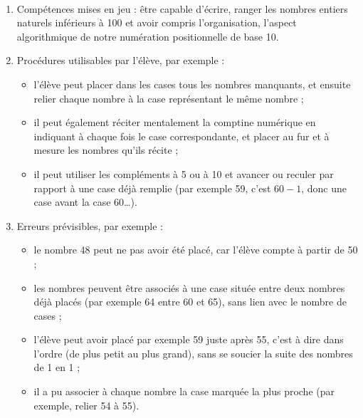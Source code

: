 \begin{corrige}
\ \\ [-5mm]
\begin{enumerate}
   \item Compétences mises en jeu : être capable d'écrire, ranger les nombres entiers naturels inférieurs à 100 et avoir compris l'organisation, l'aspect algorithmique de notre numération positionnelle de base 10.
   \item Procédures utilisables par l'élève, par exemple :
   \begin{itemize}
      \item l'élève peut placer dans les cases tous les nombres manquants, et ensuite relier chaque nombre à la case représentant le même nombre ;
      \item il peut également réciter \og mentalement \fg{} la comptine numérique en indiquant à chaque fois le case correspondante, et placer au fur et à mesure les nombres qu'ils récite ;
      \item il peut utiliser les compléments à 5 ou à 10 et avancer ou reculer par rapport à une case déjà remplie (par exemple 59, c'est $60-1$, donc une case avant la case 60\dots).
   \end{itemize}
   \item Erreurs prévisibles, par exemple :
   \begin{itemize}
      \item le nombre 48 peut ne pas avoir été placé, car l'élève compte à partir de 50 ;
      \item les nombres peuvent être associés à une case située \og entre \fg{} deux nombres déjà placés (par exemple 64 entre 60 et 65), sans lien avec le nombre de cases ;
      \item l'élève peut avoir placé par exemple 59 juste après 55, c'est à dire dans l'ordre (de plus petit au plus grand), sans se soucier la suite des nombres de 1 en 1 ;
      \item il a pu associer à chaque nombre la case marquée \og la plus proche \fg{} (par exemple, relier 54 à 55).
   \end{itemize}   
\end{enumerate}
\end{corrige}

\clearpage

